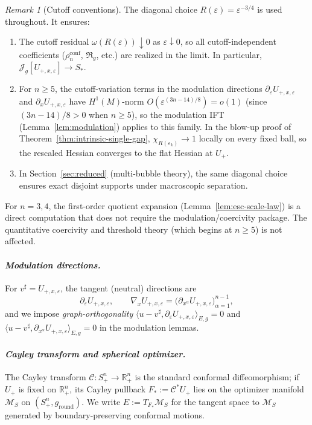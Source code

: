 \documentclass[11pt,reqno,a4paper]{amsart}
\newcommand{\R}{\mathbb{R}}
\numberwithin{equation}{section}
\theoremstyle{plain}
\theoremstyle{remark}
\newtheorem{remark}[theorem]{Remark}
\theoremstyle{plain}
\begin{document}
\begin{remark}[Cutoff conventions]\label{rem:bubble-cutoff}
The diagonal choice $R(\varepsilon)=\varepsilon^{-3/4}$ is used throughout. It ensures:
\begin{enumerate}[label=(\alph*)]
\item The cutoff residual $\omega(R(\varepsilon))\downarrow0$ as $\varepsilon\downarrow0$, so all
cutoff-independent coefficients ($\rho_n^{\mathrm{conf}}$, $\mathfrak R_g$, etc.) are
realized in the limit. In particular, $\mathcal J_g[U_{+,x,\varepsilon}]\to S_\ast$.
\item For $n\ge5$, the cutoff-variation terms in the modulation
directions $\partial_\varepsilon U_{+,x,\varepsilon}$
and $\partial_x U_{+,x,\varepsilon}$ have
$H^1(M)$-norm $O(\varepsilon^{(3n-14)/8})=o(1)$
(since $(3n-14)/8>0$ when $n\ge5$), so the
modulation IFT (Lemma~\ref{lem:modulation}) applies to this family.
In the blow-up proof of Theorem~\ref{thm:intrinsic-single-gap},
$\chi_{R(\varepsilon_k)}\to1$ locally on every fixed ball, so the
rescaled Hessian converges to the flat Hessian at $U_+$.
\item In Section~\ref{sec:reduced} (multi-bubble theory), the same diagonal choice
ensures exact disjoint supports under macroscopic separation.
\end{enumerate}
For $n=3,4$, the first-order quotient expansion
(Lemma~\ref{lem:esc-scale-law}) is a direct computation
that does not require the modulation/coercivity package.
The quantitative coercivity and threshold theory (which begins at $n\ge5$) is not affected.
\end{remark}


\paragraph{\emph{Modulation directions.}}
For $v^\sharp=U_{+,x,\varepsilon}$, the tangent (neutral) directions are
\[
\partial_\varepsilon U_{+,x,\varepsilon},\qquad \nabla_x U_{+,x,\varepsilon}=\big(\partial_{x^\alpha}U_{+,x,\varepsilon}\big)_{\alpha=1}^{n-1},
\]
and we impose \emph{graph-orthogonality} $\langle u-v^\sharp,\partial_\varepsilon U_{+,x,\varepsilon}\rangle_{E,g}=0$ and
$\langle u-v^\sharp,\partial_{x^\alpha} U_{+,x,\varepsilon}\rangle_{E,g}=0$ in the modulation lemmas.
\medskip
\paragraph{\emph{Cayley transform and spherical optimizer.}}
The Cayley transform $\mathcal C:S^n_+\to\R^n_+$ is the standard conformal diffeomorphism; if $U_+$ is fixed on $\R^n_+$, its Cayley pullback $F_\ast:=\mathcal C^\ast U_+$ lies on the optimizer manifold $\mathcal M_S$ on $(S^n_+,g_{\mathrm{round}})$. We write $E:=T_{F_\ast}\mathcal M_S$ for the tangent space to $\mathcal M_S$ generated by boundary-preserving conformal motions.
\end{document}
